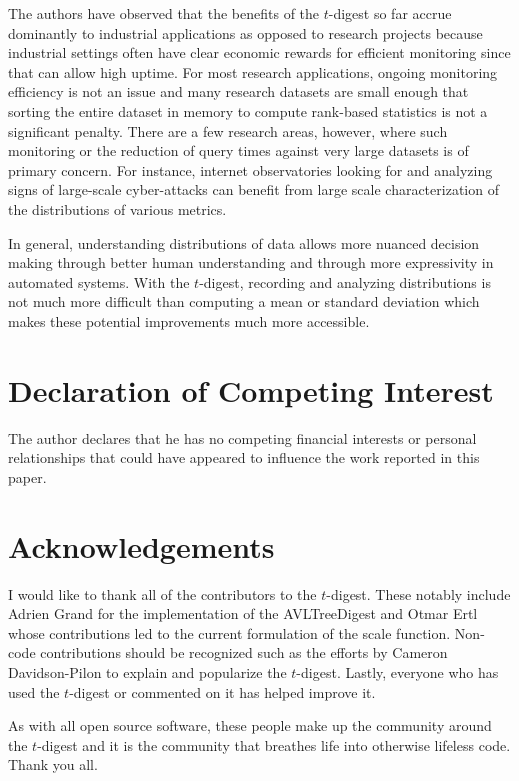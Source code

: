 \documentclass[preprint,12pt, a4paper]{elsarticle}
\begin{document}
The authors have observed that the benefits of the $t$-digest so far accrue dominantly to industrial applications as opposed to research projects because industrial settings often have clear economic rewards for efficient monitoring since that can allow high uptime. For most research applications, ongoing monitoring efficiency is not an issue and many research datasets are small enough that sorting the entire dataset in memory to compute rank-based statistics is not a significant penalty. There are a few research areas, however, where such monitoring or the reduction of query times against very large datasets is of primary concern. For instance, internet observatories looking for and analyzing signs of large-scale cyber-attacks can benefit from large scale characterization of the distributions of various metrics.

In general, understanding distributions of data allows more nuanced decision making through better human understanding and through more expressivity in automated systems. With the $t$-digest, recording and analyzing distributions is not much more difficult than computing a mean or standard deviation which makes these potential improvements much more accessible.

\section*{Declaration of Competing Interest}
The author declares that he has no competing financial interests or personal relationships that could have appeared to influence the work reported in this paper.
\section*{Acknowledgements}

I would like to thank all of the contributors to the $t$-digest. These notably include Adrien Grand for the implementation of the AVLTreeDigest and Otmar Ertl whose contributions led to the current formulation of the scale function. Non-code contributions should be recognized such as the efforts by 
Cameron Davidson-Pilon to explain and popularize the $t$-digest\cite{cameron-t-digest}. Lastly, everyone who has used the $t$-digest or commented on it has helped improve it.

As with all open source software, these people make up the community around the $t$-digest and it is the community that breathes life into otherwise lifeless code. Thank you all.
\end{document}
